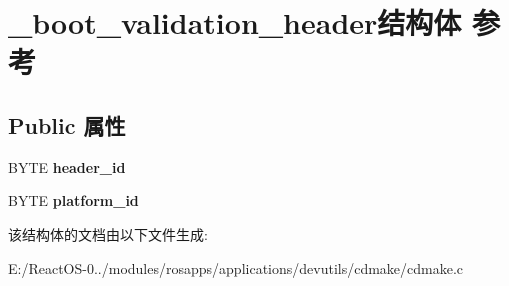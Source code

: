 \hypertarget{struct__boot__validation__header}{}\section{\+\_\+boot\+\_\+validation\+\_\+header结构体 参考}
\label{struct__boot__validation__header}
\subsection*{Public 属性}
\begin{DoxyCompactItemize}
\item 
\mbox{\label{struct__boot__validation__header_a17ac78f4ad2d6a7211f7ab9f9eac804f}} 
B\+Y\+TE {\bfseries header\+\_\+id}
\item 
\mbox{\label{struct__boot__validation__header_abc82e6521f27f558b95157fa7aab9bd3}} 
B\+Y\+TE {\bfseries platform\+\_\+id}
\end{DoxyCompactItemize}


该结构体的文档由以下文件生成\+:\begin{DoxyCompactItemize}
\item 
E\+:/\+React\+O\+S-\/0../modules/rosapps/applications/devutils/cdmake/cdmake.\+c\end{DoxyCompactItemize}
